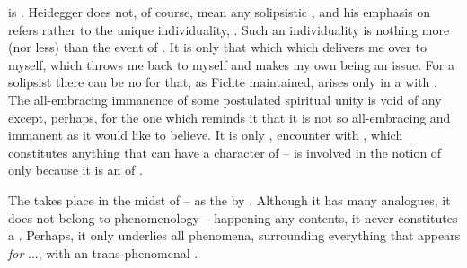 is .  Heidegger does not, of course, mean
any solipsistic , and his emphasis on  refers rather
to the unique individuality, .  Such an
individuality is nothing more (nor less) than the event of .
It is only that which  which delivers me over to myself, which
throws me back to myself and makes my own being an issue.  For a solipsist there
can be no  for that, as Fichte maintained, arises only in a
 with . The all-embracing immanence of some
postulated spiritual unity is void of any  except, perhaps, for
the one which reminds it that it is not so all-embracing and immanent as it
would like to believe. It is only , encounter with
, which constitutes anything that can have a character of
 --  is involved in the notion of 
only because it is an  of .
  
\pa The   takes place in the midst of
 -- as the  by . Although it has many
 analogues, it does not belong to phenomenology -- happening
 any  contents, it never constitutes a .
Perhaps, it only underlies all phenomena, surrounding everything that appears
{\em for} ..., with an  trans-phenomenal .

